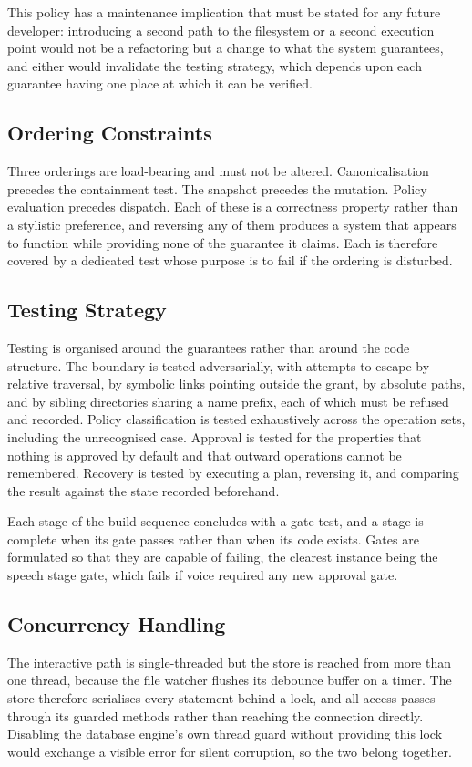 \documentclass{FastFyp}
\begin{document}
This policy has a maintenance implication that must be stated for any future developer: introducing a second path to the filesystem or a second execution point would not be a refactoring but a change to what the system guarantees, and either would invalidate the testing strategy, which depends upon each guarantee having one place at which it can be verified.

\subsection{Ordering Constraints}
Three orderings are load-bearing and must not be altered. Canonicalisation precedes the containment test. The snapshot precedes the mutation. Policy evaluation precedes dispatch. Each of these is a correctness property rather than a stylistic preference, and reversing any of them produces a system that appears to function while providing none of the guarantee it claims. Each is therefore covered by a dedicated test whose purpose is to fail if the ordering is disturbed.

\subsection{Testing Strategy}
Testing is organised around the guarantees rather than around the code structure. The boundary is tested adversarially, with attempts to escape by relative traversal, by symbolic links pointing outside the grant, by absolute paths, and by sibling directories sharing a name prefix, each of which must be refused and recorded. Policy classification is tested exhaustively across the operation sets, including the unrecognised case. Approval is tested for the properties that nothing is approved by default and that outward operations cannot be remembered. Recovery is tested by executing a plan, reversing it, and comparing the result against the state recorded beforehand.

Each stage of the build sequence concludes with a gate test, and a stage is complete when its gate passes rather than when its code exists. Gates are formulated so that they are capable of failing, the clearest instance being the speech stage gate, which fails if voice required any new approval gate.

\subsection{Concurrency Handling}
The interactive path is single-threaded but the store is reached from more than one thread, because the file watcher flushes its debounce buffer on a timer. The store therefore serialises every statement behind a lock, and all access passes through its guarded methods rather than reaching the connection directly. Disabling the database engine's own thread guard without providing this lock would exchange a visible error for silent corruption, so the two belong together.
\end{document}
